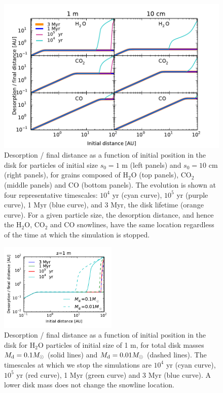 \documentclass[apj]{emulateapj}
\begin{document}
\begin{figure}[t!]
\centering
\includegraphics[width=\textwidth]{time_plots.pdf}
\caption{Desorption / final distance as a function of initial position in the disk for particles of initial size $s_0=1$ m (left panels) and $s_0=10$ cm (right panels), for grains composed of H$_2$O (top panels), CO$_2$ (middle panels) and CO (bottom panels). The evolution is shown at four representative timescales: $10^4$ yr (cyan curve), $10^5$ yr (purple curve), 1 Myr (blue curve), and 3 Myr, the disk lifetime (orange curve). For a given particle size, the desorption distance, and hence the H$_2$O, CO$_2$ and CO snowlines, have the same location regardless of the time at which the simulation is stopped.}
\label{fig:timeplots}
\end{figure}

\begin{figure}[h!]
\centering
\includegraphics[width=0.5\textwidth]{desorption_distance_varying_Md.pdf}
\caption{Desorption / final distance as a function of initial position in the disk for H$_2$O particles of initial size of 1 m, for total disk masses $M_{\rm d}=0.1 M_{\odot}$ (solid lines) and $M_{\rm d}=0.01 M_{\odot}$ (dashed lines). The timescales at which we stop the simulations are $10^4$ yr (cyan curve), $10^5$ yr (red curve), 1 Myr (green curve) and 3 Myr (blue curve). A lower disk mass does not change the snowline location.}
\label{fig:varMd}
\end{figure}
\end{document}
